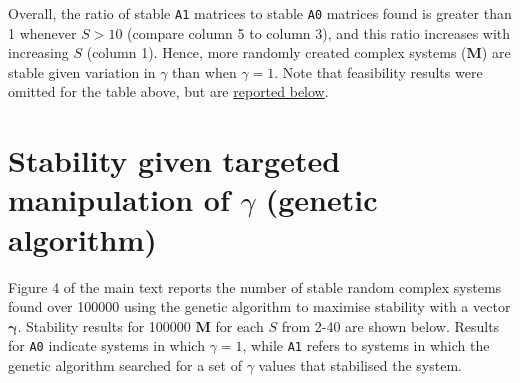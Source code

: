 \documentclass[]{article}
\begin{document}
Overall, the ratio of stable \texttt{A1} matrices to stable \texttt{A0}
matrices found is greater than 1 whenever \(S > 10\) (compare column 5
to column 3), and this ratio increases with increasing \(S\) (column 1).
Hence, more randomly created complex systems (\(\mathbf{M}\)) are stable
given variation in \(\gamma\) than when \(\gamma = 1\). Note that
feasibility results were omitted for the table above, but are
\protect\hyperlink{Feasibility}{reported below}.

\hypertarget{ga}{\section{\texorpdfstring{Stability given targeted
manipulation of \(\gamma\) (genetic
algorithm)}{Stability given targeted manipulation of \textbackslash{}gamma (genetic algorithm)}}\label{ga}}

Figure 4 of the main text reports the number of stable random complex
systems found over 100000 using the genetic algorithm to maximise
stability with a vector \(\mathbf{\gamma}\). Stability results for
100000 \(\mathbf{M}\) for each \(S\) from 2-40 are shown below. Results
for \texttt{A0} indicate systems in which \(\gamma = 1\), while
\texttt{A1} refers to systems in which the genetic algorithm searched
for a set of \(\gamma\) values that stabilised the system.
\end{document}
